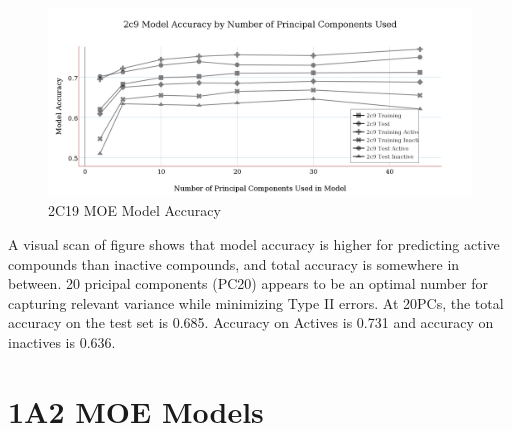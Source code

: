 \begin{figure}[!h]
\includegraphics[width=1\textwidth]{../img/2c9_moe_model_accuracy.png}
\caption{2C19 MOE Model Accuracy}
\end{figure}

A visual scan of figure shows that model accuracy is higher for predicting active compounds than inactive compounds, and total accuracy is somewhere in between. 20 pricipal components (PC20) appears to be an optimal number for capturing relevant variance while minimizing Type II errors. At 20PCs, the total accuracy on the test set is 0.685. Accuracy on Actives is 0.731 and accuracy on inactives is 0.636.

\section{1A2 MOE Models}

